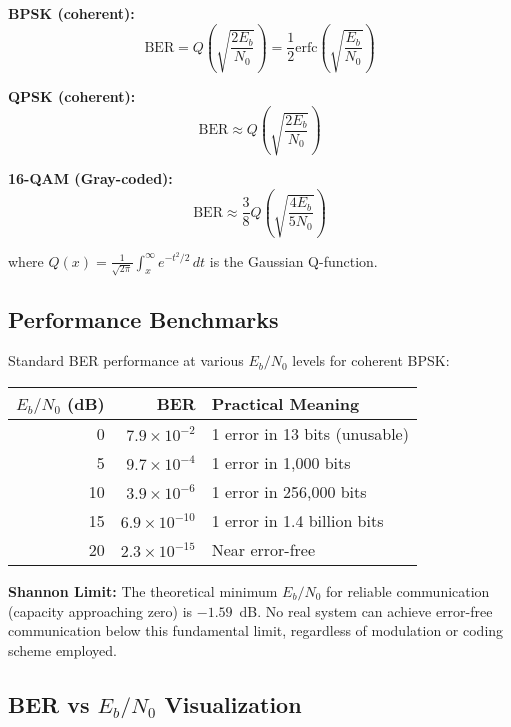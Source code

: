 \textbf{BPSK (coherent):}
\begin{equation}
\mathrm{BER} = Q\left(\sqrt{\frac{2E_b}{N_0}}\right) = \frac{1}{2}\mathrm{erfc}\left(\sqrt{\frac{E_b}{N_0}}\right)
\end{equation}

\textbf{QPSK (coherent):}
\begin{equation}
\mathrm{BER} \approx Q\left(\sqrt{\frac{2E_b}{N_0}}\right)
\end{equation}

\textbf{16-QAM (Gray-coded):}
\begin{equation}
\mathrm{BER} \approx \frac{3}{8}Q\left(\sqrt{\frac{4E_b}{5N_0}}\right)
\end{equation}

where $Q(x) = \frac{1}{\sqrt{2\pi}}\int_x^\infty e^{-t^2/2}\,dt$ is the Gaussian Q-function.

\subsection{Performance Benchmarks}

Standard BER performance at various $E_b/N_0$ levels for coherent BPSK:

\begin{center}
\begin{tabular}{@{}rrl@{}}
\toprule
$E_b/N_0$ (dB) & BER & Practical Meaning \\
\midrule
0 & $7.9 \times 10^{-2}$ & 1 error in 13 bits (unusable) \\
5 & $9.7 \times 10^{-4}$ & 1 error in 1,000 bits \\
10 & $3.9 \times 10^{-6}$ & 1 error in 256,000 bits \\
15 & $6.9 \times 10^{-10}$ & 1 error in 1.4 billion bits \\
20 & $2.3 \times 10^{-15}$ & Near error-free \\
\bottomrule
\end{tabular}
\end{center}

\begin{warningbox}
\textbf{Shannon Limit:} The theoretical minimum $E_b/N_0$ for reliable communication (capacity approaching zero) is $-1.59$~dB. No real system can achieve error-free communication below this fundamental limit, regardless of modulation or coding scheme employed.
\end{warningbox}

\subsection{BER vs $E_b/N_0$ Visualization}

